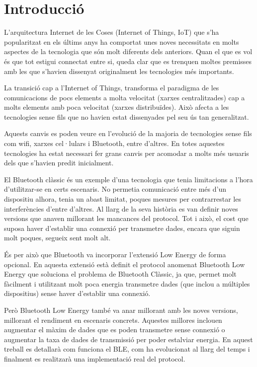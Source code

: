 \cleardoublepage
{}
\chapter*{Introducció}
L'arquitectura Internet de les Coses (Internet of Things, IoT) que s'ha popularitzat en els últims anys ha comportat unes noves necessitats en molts aspectes de la tecnologia que són molt diferents dels anteriors.
Quan el que es vol és que tot estigui connectat entre si, queda clar que es trenquen moltes premisses amb les que s'havien dissenyat originalment les tecnologies més importants.

La transició cap a l'Internet of Things, transforma el paradigma de les comunicacions de pocs elements a molta velocitat (xarxes centralitzades) cap a molts elements amb poca velocitat (xarxes distribuïdes).
Això afecta a les tecnologies sense fils que no havien estat dissenyades pel seu ús tan generalitzat.

Aquests canvis es poden veure en l'evolució de la majoria de tecnologies sense fils com wifi, xarxes cel·lulars i Bluetooth, entre d'altres.
En totes aquestes tecnologies ha estat necessari fer grans canvis per acomodar a molts més usuaris dels que s'havien predit inicialment.

El Bluetooth clàssic és un exemple d'una tecnologia que tenia limitacions a l'hora d'utilitzar-se en certs escenaris.
No permetia comunicació entre més d'un dispositiu alhora, tenia un abast limitat, poques mesures per contrarrestar les interferències d'entre d'altres.
Al llarg de la seva història es van definir noves versions que anaven millorant les mancances del protocol.
Tot i això, el cost que suposa haver d'establir una connexió per transmetre dades, encara que siguin molt poques, segueix sent molt alt.

És per això que Bluetooth va incorporar l'extensió Low Energy de forma opcional.
En aquesta extensió està definit el protocol anomenat Bluetooth Low Energy que soluciona el problema de Bluetooth Clàssic, ja que, permet molt fàcilment i utilitzant molt poca energia transmetre dades (que inclou a múltiples dispositius) sense haver d'establir una connexió.

Però Bluetooth Low Energy també va anar millorant amb les noves versions, millorant el rendiment en escenaris concrets.
Aquestes millores inclouen augmentar el màxim de dades que es poden transmetre sense connexió o augmentar la taxa de dades de transmissió per poder estalviar energia.
En aquest treball es detallarà com funciona el BLE, com ha evolucionat al llarg del temps i finalment es realitzarà una implementació real del protocol.